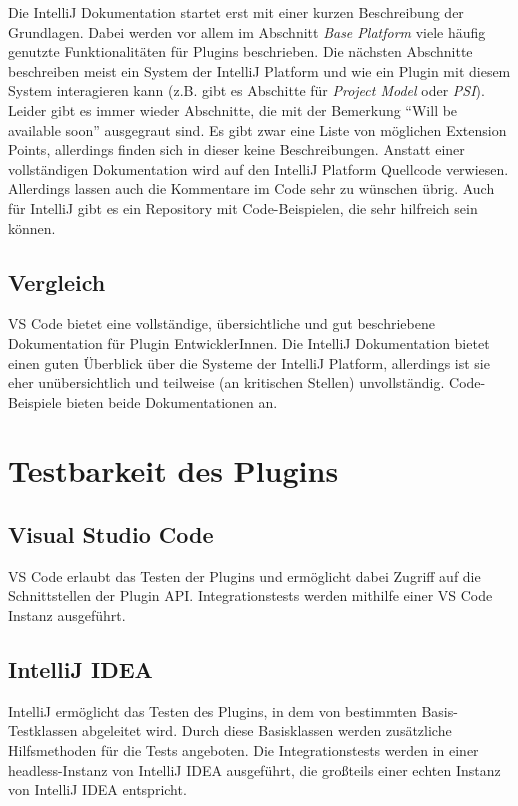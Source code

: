 Die IntelliJ Dokumentation startet erst mit einer kurzen 
Beschreibung der Grundlagen. Dabei werden vor allem im
Abschnitt \emph{Base Platform} viele häufig genutzte Funktionalitäten
für Plugins beschrieben. Die nächsten Abschnitte beschreiben
meist ein System der IntelliJ Platform und wie ein Plugin mit diesem
System interagieren kann (z.B. gibt es Abschitte für \emph{Project Model}
oder \emph{PSI}). Leider gibt es immer wieder Abschnitte, die mit der 
Bemerkung \enquote{Will be available soon} ausgegraut sind.
Es gibt zwar eine Liste von möglichen Extension Points, allerdings
finden sich in dieser keine Beschreibungen. Anstatt einer vollständigen
Dokumentation wird auf den IntelliJ Platform Quellcode verwiesen.
Allerdings lassen auch die Kommentare im Code sehr zu wünschen übrig.
Auch für IntelliJ gibt es ein Repository mit Code-Beispielen, die sehr
hilfreich sein können.

\subsection{Vergleich}

VS Code bietet eine vollständige, übersichtliche und gut beschriebene 
Dokumentation für Plugin EntwicklerInnen. Die IntelliJ Dokumentation
bietet einen guten Überblick über die Systeme der IntelliJ Platform,
allerdings ist sie eher unübersichtlich und teilweise 
(an kritischen Stellen) unvollständig.
Code-Beispiele bieten beide Dokumentationen an.

\section{Testbarkeit des Plugins}
\label{sec:Vergleich_Testbarkeit}

\subsection{Visual Studio Code}

VS Code erlaubt das Testen der Plugins und ermöglicht
dabei Zugriff auf die Schnittstellen der Plugin API.
Integrationstests werden mithilfe einer VS Code Instanz ausgeführt.

\subsection{IntelliJ IDEA}

IntelliJ ermöglicht das Testen des Plugins, in dem
von bestimmten Basis-Testklassen abgeleitet wird. Durch diese
Basisklassen werden zusätzliche Hilfsmethoden für die Tests
angeboten. Die Integrationstests werden in einer
headless-Instanz von IntelliJ IDEA ausgeführt, die großteils
einer echten Instanz von IntelliJ IDEA entspricht.

